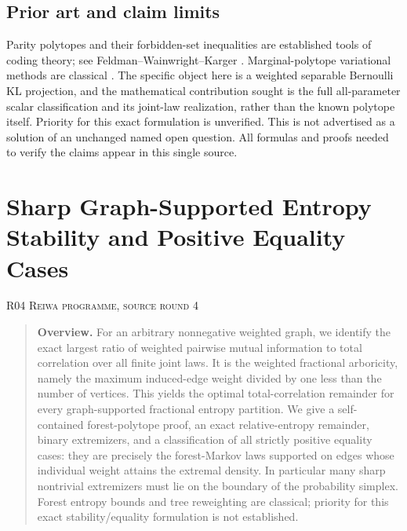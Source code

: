 \documentclass[11pt,a4paper]{article}
\theoremstyle{definition}\newtheorem{definition}[theorem]{Definition}
\theoremstyle{remark}\newtheorem{remark}[theorem]{Remark}
\numberwithin{equation}{section}
\begin{document}
\subsection{Prior art and claim limits}\label{R03-sec-6}
Parity polytopes and their forbidden-set inequalities are established tools of coding theory; see Feldman--Wainwright--Karger \cite{ref064}. Marginal-polytope variational methods are classical \cite{ref063}. The specific object here is a weighted separable Bernoulli KL projection, and the mathematical contribution sought is the full all-parameter scalar classification and its joint-law realization, rather than the known polytope itself. Priority for this exact formulation is unverified. This is not advertised as a solution of an unchanged named open question. All formulas and proofs needed to verify the claims appear in this single source.




\clearpage
\section[R04 --- Sharp Graph-Supported Entropy Stability and Positive Equality Cases]{Sharp Graph-Supported Entropy Stability and Positive Equality Cases}\label{contrib-R04}
\noindent\textsc{R04 \quad Reiwa programme, source round 4}\par\medskip


\begin{quote}\small\textbf{Overview.} For an arbitrary nonnegative weighted graph, we identify the exact largest ratio of weighted pairwise mutual information to total correlation over all finite joint laws. It is the weighted fractional arboricity, namely the maximum induced-edge weight divided by one less than the number of vertices. This yields the optimal total-correlation remainder for every graph-supported fractional entropy partition. We give a self-contained forest-polytope proof, an exact relative-entropy remainder, binary extremizers, and a classification of all strictly positive equality cases: they are precisely the forest-Markov laws supported on edges whose individual weight attains the extremal density. In particular many sharp nontrivial extremizers must lie on the boundary of the probability simplex. Forest entropy bounds and tree reweighting are classical; priority for this exact stability/equality formulation is not established.\end{quote}
\end{document}
